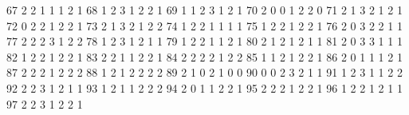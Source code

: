 \documentclass[
  letterpaper,
  DIV=11,
  numbers=noendperiod]{scrreprt}
\newenvironment{Shaded}{\begin{snugshade}}{\end{snugshade}}
\newcommand{\NormalTok}[1]{\textcolor[rgb]{0.00,0.23,0.31}{#1}}
\begin{document}
\begin{Shaded}
\begin{Highlighting}[]
\NormalTok{67               2     2         1            1        1         2      1}
\NormalTok{68               1     2         3            1        2         2      1}
\NormalTok{69               1     1         2            3        1         2      1}
\NormalTok{70               2     0         0            1        2         2      0}
\NormalTok{71               2     1         3            2        1         2      1}
\NormalTok{72               0     2         2            1        2         2      1}
\NormalTok{73               2     1         3            2        1         2      2}
\NormalTok{74               1     2         2            1        1         1      1}
\NormalTok{75               1     2         2            1        2         2      1}
\NormalTok{76               2     0         3            2        2         1      1}
\NormalTok{77               2     2         2            3        1         2      2}
\NormalTok{78               1     2         3            1        2         1      1}
\NormalTok{79               1     2         2            1        1         2      1}
\NormalTok{80               2     1         2            1        2         1      1}
\NormalTok{81               2     0         3            3        1         1      1}
\NormalTok{82               1     2         2            1        2         2      1}
\NormalTok{83               2     2         1            1        2         2      1}
\NormalTok{84               2     2         2            2        1         2      2}
\NormalTok{85               1     1         2            1        2         2      1}
\NormalTok{86               2     0         1            1        1         2      1}
\NormalTok{87               2     2         2            1        2         2      2}
\NormalTok{88               1     2         1            2        2         2      2}
\NormalTok{89               2     1         0            2        1         0      0}
\NormalTok{90               0     0         2            3        2         1      1}
\NormalTok{91               1     2         3            1        1         2      2}
\NormalTok{92               2     2         3            1        2         1      1}
\NormalTok{93               1     2         1            1        2         2      2}
\NormalTok{94               2     0         1            1        2         2      1}
\NormalTok{95               2     2         2            1        2         2      1}
\NormalTok{96               1     2         2            1        2         1      1}
\NormalTok{97               2     2         3            1        2         2      1}

\end{Highlighting}
\end{Shaded}
\end{document}
